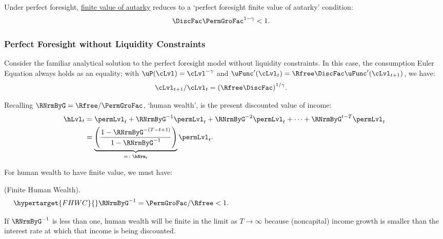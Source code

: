 \documentclass[BufferStockTheory]{subfiles}
\begin{document}
%
Under perfect foresight,  \hyperlink{FVAC}{finite value of autarky} reduces to a `perfect foresight finite value of autarky' condition: 
%
\hypertarget{PFFVAC}{}
\begin{equation}\begin{gathered}\begin{aligned}  
         \DiscFac \PermGroFac^{1-\CRRA}  & <  1.  
\end{aligned}\end{gathered}\label{eq:PFFVAC}\end{equation}


\subsubsection{Perfect Foresight without Liquidity Constraints}\label{subsubsec:PFUncon}



Consider the familiar analytical solution to the perfect foresight model without liquidity constraints.
In this case, the consumption Euler Equation always holds as an equality; with $\uP(\cLvl)=\cLvl^{-\CRRA}$ and $\uFunc^{\prime}(\cLvl_{t})=\Rfree\DiscFac\uFunc^{\prime}(\cLvl_{t+1})$, we have:
%
%
\begin{equation}\begin{gathered}\begin{aligned}
  \cLvl_{t+1}/\cLvl_{t}  & = {(\Rfree\DiscFac)}^{1/\CRRA}. \label{eq:cGroFac}
\end{aligned}\end{gathered}\end{equation} 
%

Recalling $\RNrmByG  = \Rfree/\PermGroFac$, `human wealth', is the present discounted value of income:
%
% 
\begin{equation}\begin{gathered}\begin{aligned}
  \hLvl_{t}  & = \permLvl_{t}+\RNrmByG^{-1} \permLvl_{t} + \RNrmByG^{-2} \permLvl_{t} + \cdots + \RNrmByG^{t-T} \permLvl_{t} \notag
  \\  & = \underbrace{\left(\frac{1-\RNrmByG^{-(T-t+1)}}{1-\RNrmByG^{-1}}\right)}_{ = \colon \hNrm_{t}}\permLvl_{t} \label{eq:HDef}.
\end{aligned}\end{gathered}\end{equation}

For human wealth to have finite value, we must have:
%
\begin{assumI}\label{ass:FHWC}(Finite Human Wealth).
\begin{equation}\begin{gathered}\begin{aligned}\hypertarget{FHWC}{}
   \RNrmByG^{-1} = \PermGroFac/\Rfree  & < 1. \phantom{\text{{\FHWC}:~~}}\label{eq:FHWC2}
\end{aligned}\end{gathered}\end{equation}
\end{assumI}
%
If $\RNrmByG^{-1}$ is less than one, human wealth will be finite in the limit as $T \rightarrow \infty$ because (noncapital) income growth is smaller than the interest rate at which that income is being discounted.
\end{document}
